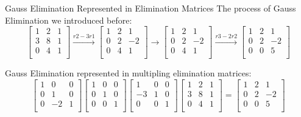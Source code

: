 \documentclass{beamer}
\begin{document}
\begin{frame}{Gauss Elimination Represented in Elimination Matrices}
The process of Gauss Elimination we introduced before:
\begin{equation*}
    \left[ \begin{matrix}
        1&		2&		1\\
        3&		8&		1\\
        0&		4&		1\\
    \end{matrix} \right] \xrightarrow{r2-3r1}\left[ \begin{matrix}
        1&		2&		1\\
        0&		2&		-2\\
        0&		4&		1\\
    \end{matrix} \right] \rightarrow \left[ \begin{matrix}
        1&		2&		1\\
        0&		2&		-2\\
        0&		4&		1\\
    \end{matrix} \right] \xrightarrow{r3-2r2}\left[ \begin{matrix}
        1&		2&		1\\
        0&		2&		-2\\
        0&		0&		5\\
    \end{matrix} \right]
\end{equation*}

Gauss Elimination represented in multipling elimination matrices:
\begin{equation*}
    \left[ \begin{matrix}
        1&		0&		0\\
        0&		1&		0\\
        0&		-2&		1\\
    \end{matrix} \right] \left[ \begin{matrix}
        1&		0&		0\\
        0&		1&		0\\
        0&		0&		1\\
    \end{matrix} \right] \left[ \begin{matrix}
        1&		0&		0\\
        -3&		1&		0\\
        0&		0&		1\\
    \end{matrix} \right] \left[ \begin{matrix}
        1&		2&		1\\
        3&		8&		1\\
        0&		4&		1\\
    \end{matrix} \right] =\left[ \begin{matrix}
        1&		2&		1\\
        0&		2&		-2\\
        0&		0&		5\\
    \end{matrix} \right]
\end{equation*}


\end{frame}
\end{document}

